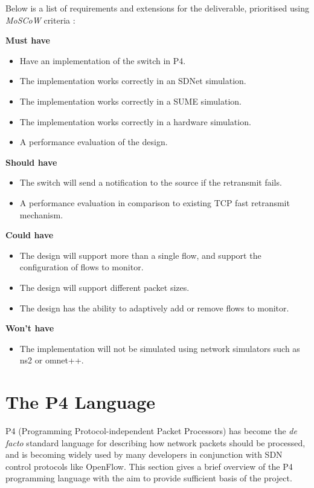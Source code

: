 Below is a list of requirements and extensions for the deliverable, prioritised using \textit{MoSCoW} criteria \cite{moscow}:

\textbf{Must have}
\begin{itemize}
	\item Have an implementation of the switch in P4. 
	\item The implementation works correctly in an SDNet simulation.
	\item The implementation works correctly in a SUME simulation.
	\item The implementation works correctly in a hardware simulation.
	\item A performance evaluation of the design.
\end{itemize}

\textbf{Should have}
\begin{itemize}
	\item The switch will send a notification to the source if the retransmit fails.
	\item A performance evaluation in comparison to existing TCP fast retransmit mechanism.
\end{itemize}

\textbf{Could have}
\begin{itemize}
	\item The design will support more than a single flow, and support the configuration of flows to monitor.
	\item The design will support different packet sizes.
	\item The design has the ability to adaptively add or remove flows to monitor.
\end{itemize}

\textbf{Won't have}
\begin{itemize}
	\item The implementation will not be simulated using network simulators such as ns2 or omnet++.
\end{itemize}

\section{The P4 Language}
P4 (Programming Protocol-independent Packet Processors) has become the \textit{de facto} standard language for describing how network packets should be processed, and is becoming widely used by many developers in  conjunction with SDN control protocols like OpenFlow. This section gives a brief overview of the P4 programming language with the aim to provide sufficient basis of the project.

